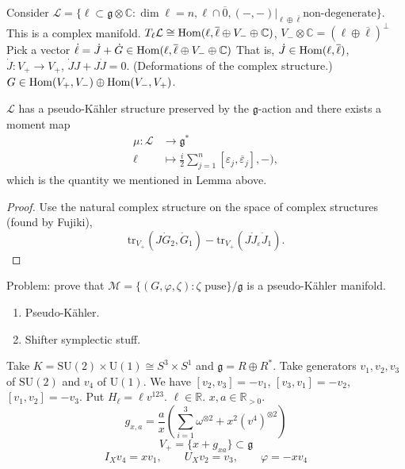 {Consider $\mathcal{L}=\{\ell \subset \mathfrak{g} \otimes \mathbb{C}:
\dim\ell=n,\ell\cap\overline{0},(-,-)|_{\ell \oplus \overline{\ell}}
\text{non-degenerate}\}$.
This is a complex manifold.
$T_\ell \mathcal{L} 
\cong \mathop{\mathrm{Hom}}\nolimits(\ell,\overline{\ell}\oplus V_- \oplus \mathbb{C})$,
$V_- \otimes \mathbb{C}=(\ell \oplus \overline{\ell})^\perp$
Pick a vector $\dot \ell = \dot J + \dot G \in 
\mathop{\mathrm{Hom}}\nolimits(\ell,\overline{\ell}\oplus V_- \oplus \mathbb{C})$
That is, $\dot J \in \mathop{\mathrm{Hom}}\nolimits(\ell, \overline{\ell})$,
$\dot J :V_+ \to V_+$,
$\dot J J+ J \dot J=0$. (Deformations of the complex structure.)
$G \in \mathop{\mathrm{Hom}}\nolimits(V_+,V_-) \oplus \mathop{\mathrm{Hom}}\nolimits(V_-,V_+)$.

\begin{proposition}[Romero]
\label{proposition-Romero}
$\mathcal{L}$ has a pseudo-Kähler structure
preserved by the $\mathfrak{g}$-action and there exists
a moment map
\begin{align*}
\mu: \mathcal{L} &\longrightarrow \mathfrak{g}^* \\
\ell &\longmapsto
\frac{i}{2}\sum_{j=1}^n[\varepsilon_j,\overline{\varepsilon}_j],-),
\end{align*}
which is the quantity we mentioned in Lemma above.
\end{proposition}

\begin{proof}
Use the natural complex structure on the space of complex structures
(found by Fujiki),
$$
\text{tr}_{V_+}(J \dot G_2,\dot G_1)-\text{tr}_{V_+}(J \dot J_{\varepsilon}
\dot J_1).
$$ 
\end{proof}

Problem: prove that 
$\mathcal{M}=\{(G,\varphi,\zeta):\zeta\text{ puse}\}/\mathfrak{g}$
is a pseudo-Kähler manifold.

\begin{enumerate}
\item Pseudo-Kähler.
\item Shifter symplectic stuff.
\end{enumerate}

\begin{example}
\label{example-SU2xSU1}
Take $K=\text{SU}(2)\times\text{U}(1)\cong S^3\times S^1$
and $\mathfrak{g}=R \oplus R^*$.
Take generators $v_1,v_2,v_3$ of $\text{SU}(2)$ and $v_4$ of $\text{U}(1)$.
We have $[v_2,v_3]=-v_1$, $[v_3,v_1]=-v_2$, $[v_1,v_2]=-v_3$.
Put $H_\ell=\ell v^{123}$. $\ell \in \mathbb{R}$. $x,a \in \mathbb{R}_{>0}$.
$$
g_{x,a}=\frac{a}{x}\left(\sum_{i=1}^3\omega^{\otimes 2}
+x^2 (v^4)^{\otimes 2}\right)
$$
$$
V_+=\{ x+g_{xa}\}\subset \mathfrak{g}
$$
$$
I_X v_4=xv_1,\qquad U_X v_2=v_3, \qquad \varphi=-xv_4
$$
\end{example}

}
